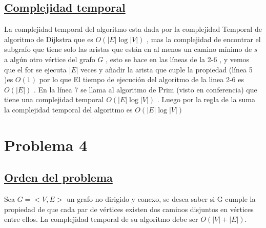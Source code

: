 \documentclass{article}
\begin{document}
    \subsection{\underline{Complejidad temporal}}

    \noindent La complejidad temporal del algoritmo esta dada por la complejidad Temporal de algoritmo de Dijkstra 
    que es $O(|E|\log |V|)$ , mas la complejidad de encontrar el subgrafo que tiene solo las aristas que est\'an en al menos 
    un camino m\'inimo de $s$ a alg\'un otro v\'ertice del grafo $G$ , esto se hace en las l\'ineas de la 2-6 , y vemos que el for se 
    ejecuta $|E|$ veces  y a\~nadir la arista que cuple la propiedad (l\'inea 5 )es $O(1)$ por lo que El tiempo de ejecuci\'on del algoritmo 
    de la linea 2-6 es $O(|E|)$ . En la l\'inea 7 se llama al algoritmo de Prim (visto en conferencia) que tiene una complejidad temporal
    $O(|E|\log |V|)$ . Luego por la regla de la suma la complejidad temporal del algoritmo es  $O(|E|\log |V|)$

    \newpage


    \section{Problema 4} 

    \subsection{\underline{Orden del problema}} 
    Sea $G = <V, E>$ un grafo no dirigido y conexo, se desea saber si G cumple la propiedad de que cada par de
    v\'ertices existen dos caminos disjuntos en v\'ertices entre ellos. La complejidad temporal de su algoritmo debe
    ser $O(|V| + |E|)$.
    \newline
    \newline
\end{document}
